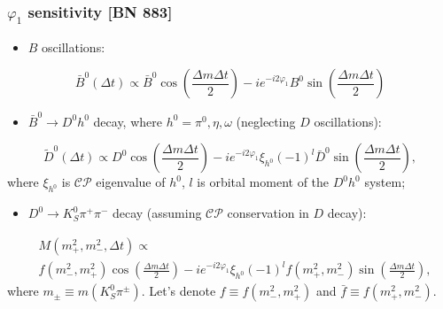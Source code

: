 \documentclass[10 pt,compress,mathserif]{beamer}
\newcommand{\cpconj}{\ensuremath{\mathcal{CP}}\xspace}
\newcommand{\dkspp}{\ensuremath{D^0\to K_S^0\pi^+\pi^-}\xspace}
\begin{document}
\begin{frame}
 \frametitle{$\varphi_1$ sensitivity [BN 883]}
 \begin{small}
 \begin{itemize}
  \item $B$ oscillations:
 \end{itemize}
 \begin{equation}
  \bar B^0\left(\Delta t\right) \propto \bar B^0\cos\left(\frac{\Delta m\Delta t}{2}\right)-ie^{-i2\varphi_1}B^0\sin\left(\frac{\Delta m\Delta t}{2}\right)
 \end{equation}
  \begin{itemize}
  \item $\bar B^0\to D^0h^0$ decay, where $h^0 = \pi^0,\eta,\omega$ (neglecting $D$ oscillations):
 \end{itemize}
 \begin{equation}
  \widetilde{D}^0\left(\Delta t\right) \propto D^0\cos\left(\frac{\Delta m\Delta t}{2}\right)-ie^{-i2\varphi_1}\xi_{h^0}(-1)^l\bar D^0\sin\left(\frac{\Delta m\Delta t}{2}\right),
 \end{equation}
  where $\xi_{h^0}$ is \cpconj eigenvalue of $h^0$, $l$ is orbital moment of the $D^0h^0$ system;
 \begin{itemize}
  \item \dkspp decay (assuming \cpconj conservation in $D$ decay):
 \end{itemize}
 \begin{equation}
 \begin{split}
  &M\left(m_+^2,m_-^2,\Delta t\right) \propto\\
  &f\left(m_-^2,m_+^2\right)\cos\left(\frac{\Delta m\Delta t}{2}\right)-ie^{-i2\varphi_1}\xi_{h^0}(-1)^l f\left(m_+^2,m_-^2\right)\sin\left(\frac{\Delta m\Delta t}{2}\right),
 \end{split}
 \end{equation}
 where $m_{\pm} \equiv m\left(K_S^0\pi^{\pm}\right)$. Let's denote $f \equiv f\left(m_-^2,m_+^2\right)$ and $\bar f \equiv f\left(m_+^2,m_-^2\right)$.
 \end{small}
\end{frame}
\end{document}
